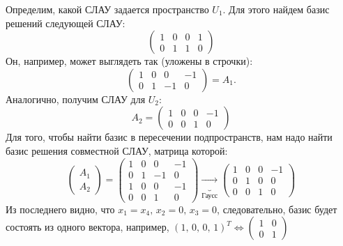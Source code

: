 Определим, какой СЛАУ задается пространство $U_1$. Для этого найдем базис решений следующей СЛАУ:
\begin{equation}
    \begin{pmatrix}
        1 & 0 & 0 & 1 \\
        0 & 1 & 1 & 0
    \end{pmatrix}
\end{equation}
Он, например, может выглядеть так (уложены в строчки):
\begin{equation}
    \begin{pmatrix}
        1 & 0 &  0 & -1 \\
        0 & 1 & -1 &  0
    \end{pmatrix} = A_1.
\end{equation}
Аналогично, получим СЛАУ для $U_2$:
\begin{equation}
    A_2 = 
    \begin{pmatrix}
        1 & 0 & 0 & -1 \\
        0 & 0 & 1 &  0
    \end{pmatrix}
\end{equation}
Для того, чтобы найти базис в пересечении подпространств, нам надо найти базис решения совместной СЛАУ, матрица которой:
\begin{equation}
    \begin{pmatrix}
        A_1 \\
        A_2
    \end{pmatrix} = 
    \begin{pmatrix}
        1 & 0 &  0 & -1 \\
        0 & 1 & -1 &  0 \\
        1 & 0 &  0 & -1 \\
        0 & 0 &  1 &  0
    \end{pmatrix} \underbrace{\rightarrow}_{\text{Гаусс}}
    \begin{pmatrix}
        1 & 0 & 0 & -1 \\
        0 & 1 & 0 &  0 \\
        0 & 0 & 1 &  0 
    \end{pmatrix}
\end{equation}
Из последнего видно, что $x_1 = x_4, \, x_2 = 0, \, x_3 = 0$, следовательно, базис будет состоять из одного вектора, например, $(1,\,0,\,0,\,1)^T \Longleftrightarrow
\begin{pmatrix}
    1 & 0 \\
    0 & 1
\end{pmatrix}$

